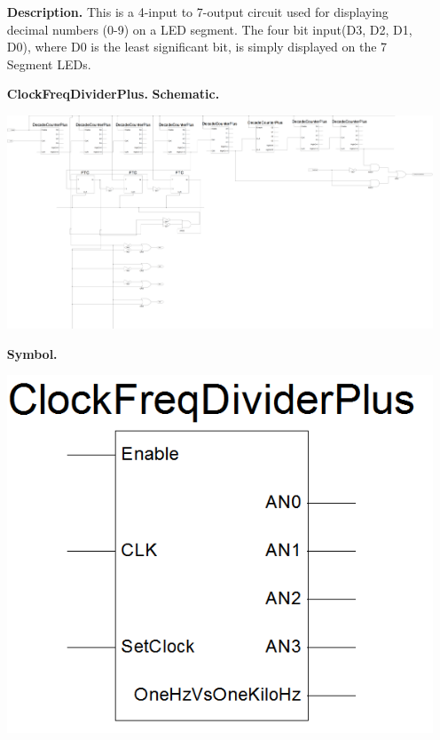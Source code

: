 \documentclass[9pt]{article}
\begin{document}
\begin{enumerate}
             \textbf{Description.} This is a 4-input to 7-output circuit used
             for displaying decimal numbers (0-9) on a LED segment. The four
             bit input(D3, D2, D1, D0), where D0 is the least significant bit,
             is simply displayed on the 7 Segment LEDs.
             
  	\item[\textbf{ClockFreqDividerPlus.}] \textbf{Schematic.}
   
             \begin{center}
                \includegraphics[width=\textwidth]{ClockFreqDivider.png}
             \end{center}
             
             \newpage
             \textbf{Symbol.}
   
             \begin{center}
                \includegraphics[width=\textwidth]{ClockFreqDividerSym.png}
             \end{center}
             

\end{enumerate}
\end{document}
